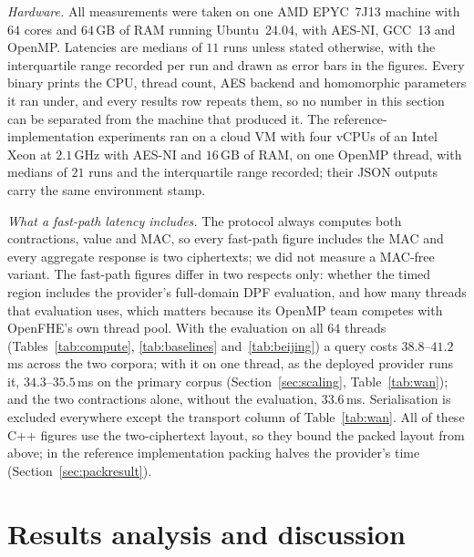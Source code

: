 \documentclass[a4paper,fleqn]{cas-sc}
\newif\ifauthorchecks
\newcommand{\authorcheck}[1]{\ifauthorchecks{\color{red}\textsf{[Authors: #1]}}\fi}
\begin{document}
\emph{Hardware.} All measurements were taken on one AMD EPYC~7J13 machine with
$64$ cores and $64$\,GB of RAM running Ubuntu~24.04, with AES-NI, GCC~13 and
OpenMP. Latencies are medians of $11$ runs unless stated otherwise, with the
interquartile range recorded per run and drawn as error bars in the
figures. Every binary prints the CPU, thread count, AES backend and
homomorphic parameters it ran under, and every results row repeats them, so no
number in this section can be separated from the machine that produced it.
The reference-implementation experiments ran on a cloud VM with four vCPUs of
an Intel Xeon at $2.1$\,GHz with AES-NI and $16$\,GB of RAM, on one OpenMP
thread, with medians of $21$ runs and the interquartile range recorded; their
JSON outputs carry the same environment stamp.

\emph{What a fast-path latency includes.} The protocol always computes both
contractions, value and MAC, so every fast-path figure includes the MAC and
every aggregate response is two ciphertexts; we did not measure a MAC-free
variant. The fast-path figures differ in two respects only: whether the timed
region includes the provider's full-domain DPF evaluation, and how many
threads that evaluation uses, which matters because its OpenMP team competes
with OpenFHE's own thread pool. With the evaluation on all $64$ threads
(Tables~\ref{tab:compute}, \ref{tab:baselines} and~\ref{tab:beijing}) a query
costs $38.8$--$41.2$\,ms across the two corpora; with it on one thread, as the
deployed provider runs it, $34.3$--$35.5$\,ms on the primary corpus
(Section~\ref{sec:scaling}, Table~\ref{tab:wan}); and the two contractions
alone, without the evaluation, $33.6$\,ms. Serialisation is excluded
everywhere except the transport column of Table~\ref{tab:wan}. All of these C++
figures use the two-ciphertext layout, so they bound the packed
layout from above; in the reference implementation packing halves the
provider's time (Section~\ref{sec:packresult}).
\authorcheck{Re-measure Tables~\ref{tab:compute}, \ref{tab:baselines},
\ref{tab:wan} and~\ref{tab:beijing} with the packed, compressed layout in C++,
then update the abstract and conclusion.}

\section{Results analysis and discussion}
\label{sec:resultsdisc}
\end{document}
